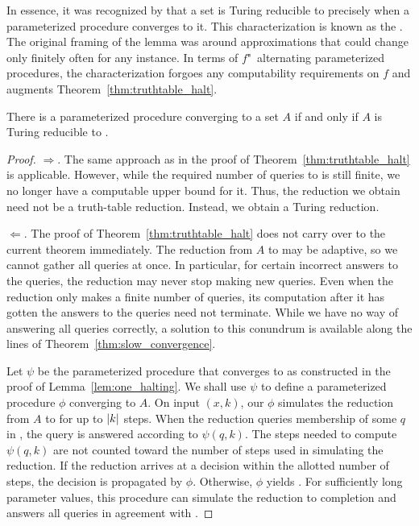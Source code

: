 In essence, it was recognized by \textcite{shoenfield1959degrees} that a set is Turing reducible to  precisely when a parameterized procedure converges to it.
This characterization is known as the  \parencite{odifreddi1992classical,downey2010algorithmic}.
The original framing of the lemma was around approximations that could change only finitely often for any instance.
In terms of $f$"~alternating parameterized procedures, the characterization forgoes any computability requirements on $f$ and augments Theorem~\ref{thm:truthtable_halt}.
\begin{theorem}
\label{thm:turing_halt}%
  There is a parameterized procedure converging to a set $A$ if and only if $A$ is Turing reducible to .
\end{theorem}
\begin{proof}
  $\Longrightarrow$.
  The same approach as in the proof of Theorem~\ref{thm:truthtable_halt} is applicable.
  However, while the required number of queries to  is still finite, we no longer have a computable upper bound for it.
  Thus, the reduction we obtain need not be a truth-table reduction.
  Instead, we obtain a Turing reduction.

  $\Longleftarrow$.
  The proof of Theorem~\ref{thm:truthtable_halt} does not carry over to the current theorem immediately.
  The reduction from $A$ to  may be adaptive, so we cannot gather all queries at once.
  In particular, for certain incorrect answers to the queries, the reduction may never stop making new queries.
  Even when the reduction only makes a finite number of queries, its computation after it has gotten the answers to the queries need not terminate.
  While we have no way of answering all queries correctly, a solution to this conundrum is available along the lines of Theorem~\ref{thm:slow_convergence}.

  Let $\psi$ be the parameterized procedure that converges to  as constructed in the proof of Lemma~\ref{lem:one_halting}.
  We shall use $\psi$ to define a parameterized procedure $\phi$ converging to $A$.
  On input $(x, k)$, our $\phi$ simulates the reduction from $A$ to  for up to ${\lvert k\rvert}$ steps.
  When the reduction queries membership of some $q$ in , the query is answered according to $\psi(q, k)$.
  The steps needed to compute $\psi(q, k)$ are not counted toward the number of steps used in simulating the reduction.
  If the reduction arrives at a decision within the allotted number of steps, the decision is propagated by $\phi$.
  Otherwise, $\phi$ yields .
  For sufficiently long parameter values, this procedure can simulate the reduction to completion and answers all queries in agreement with .
\end{proof}

